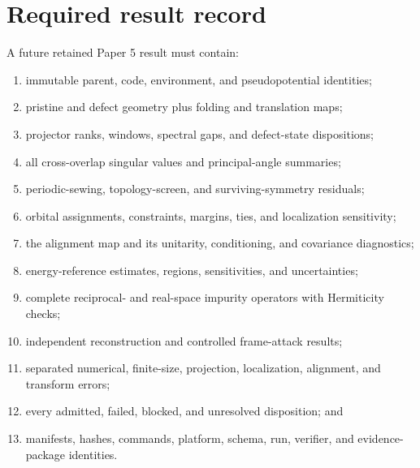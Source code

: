 \documentclass[11pt]{article}
\begin{document}
\section{Required result record}
A future retained Paper 5 result must contain:
\begin{enumerate}
 \item immutable parent, code, environment, and pseudopotential identities;
 \item pristine and defect geometry plus folding and translation maps;
 \item projector ranks, windows, spectral gaps, and defect-state dispositions;
 \item all cross-overlap singular values and principal-angle summaries;
 \item periodic-sewing, topology-screen, and surviving-symmetry residuals;
 \item orbital assignments, constraints, margins, ties, and localization sensitivity;
 \item the alignment map and its unitarity, conditioning, and covariance diagnostics;
 \item energy-reference estimates, regions, sensitivities, and uncertainties;
 \item complete reciprocal- and real-space impurity operators with Hermiticity checks;
 \item independent reconstruction and controlled frame-attack results;
 \item separated numerical, finite-size, projection, localization, alignment, and transform errors;
 \item every admitted, failed, blocked, and unresolved disposition; and
 \item manifests, hashes, commands, platform, schema, run, verifier, and evidence-package identities.
\end{enumerate}



\end{document}
